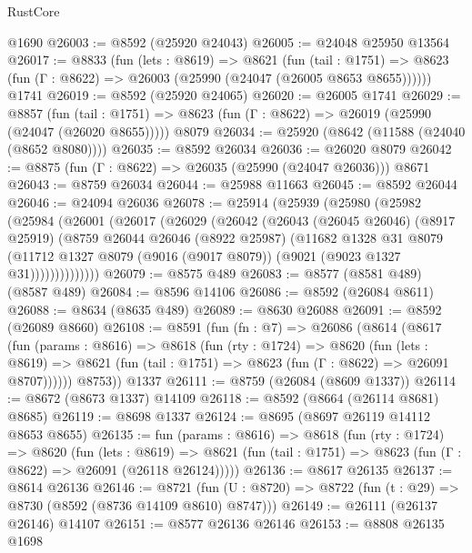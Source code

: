 \begin{lexlean}{RustCore}
\begin{coremodule}
    @1690
@26003 := @8592 (@25920 @24043)
@26005 := @24048 @25950 @13564
@26017 := @8833
    (fun (lets : @8619) =>
    @8621
      (fun (tail : @1751) =>
      @8623 (fun (Γ : @8622) => @26003 (@25990 (@24047 (@26005 @8653 @8655))))))
    @1741
@26019 := @8592 (@25920 @24065)
@26020 := @26005 @1741
@26029 := @8857
    (fun (tail : @1751) => @8623 (fun (Γ : @8622) => @26019 (@25990 (@24047 (@26020 @8655)))))
    @8079
@26034 := @25920 (@8642 (@11588 (@24040 (@8652 @8080))))
@26035 := @8592 @26034
@26036 := @26020 @8079
@26042 := @8875 (fun (Γ : @8622) => @26035 (@25990 (@24047 @26036))) @8671
@26043 := @8759 @26034
@26044 := @25988 @11663
@26045 := @8592 @26044
@26046 := @24094 @26036
@26078 := @25914
    (@25939
      (@25980
        (@25982
          (@25984
            (@26001
              (@26017
                (@26029
                  (@26042
                    (@26043
                      (@26045 @26046)
                      (@8917 @25919)
                      (@8759
                        @26044
                        @26046
                        (@8922 @25987)
                        (@11682
                          @1328
                          @31
                          @8079
                          (@11712
                            @1327
                            @8079
                            (@9016 (@9017 @8079))
                            (@9021 (@9023 @1327 @31))))))))))))))
@26079 := @8575 @489
@26083 := @8577 (@8581 @489) (@8587 @489)
@26084 := @8596 @14106
@26086 := @8592 (@26084 @8611)
@26088 := @8634 (@8635 @489)
@26089 := @8630 @26088
@26091 := @8592 (@26089 @8660)
@26108 := @8591
    (fun (fn : @7) =>
    @26086
      (@8614
        (@8617
          (fun (params : @8616) =>
          @8618
            (fun (rty : @1724) =>
            @8620
              (fun (lets : @8619) =>
              @8621 (fun (tail : @1751) => @8623 (fun (Γ : @8622) => @26091 @8707))))))
        @8753))
    @1337
@26111 := @8759 (@26084 (@8609 @1337))
@26114 := @8672 (@8673 @1337) @14109
@26118 := @8592 (@8664 (@26114 @8681) @8685)
@26119 := @8698 @1337
@26124 := @8695 (@8697 @26119 @14112 @8653 @8655)
@26135 := fun (params : @8616) =>
  @8618
    (fun (rty : @1724) =>
    @8620
      (fun (lets : @8619) =>
      @8621 (fun (tail : @1751) => @8623 (fun (Γ : @8622) => @26091 (@26118 @26124)))))
@26136 := @8617 @26135
@26137 := @8614 @26136
@26146 := @8721
    (fun (U : @8720) => @8722 (fun (t : @29) => @8730 (@8592 (@8736 @14109 @8610) @8747)))
@26149 := @26111 (@26137 @26146) @14107
@26151 := @8577 @26136 @26146
@26153 := @8808 @26135 @1698

\end{coremodule}
\end{lexlean}
